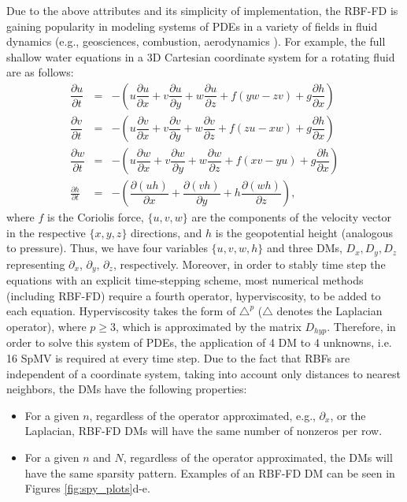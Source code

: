 \documentclass{sig-alternate}
\begin{document}
Due to the above attributes and its simplicity of implementation, the RBF-FD is gaining popularity in modeling systems of PDEs in a variety of fields in fluid dynamics (e.g., geosciences, combustion, aerodynamics \cite{Bayona13,CDNT,FoL11,FLBWSC12,SPLM}). For example, the full shallow water equations in a 3D Cartesian coordinate system for a rotating fluid are as follows:
{ \small
\begin{eqnarray}
\dfrac{\partial u}{\partial t} &=& - \left( u\dfrac{\partial u}{\partial x} + v\dfrac{\partial u}{\partial y} + w\dfrac{\partial u}{\partial z} + f(yw - zv) + g\dfrac{\partial h}{\partial x} \right) 
\nonumber \\
\dfrac{\partial v}{\partial t} &=& - \left( u\dfrac{\partial v}{\partial x} + v\dfrac{\partial v}{\partial y} + w\dfrac{\partial v}{\partial z} + f(zu - xw) + g\dfrac{\partial h}{\partial x} \right)
\nonumber\\
\dfrac{\partial w}{\partial t} &=& - \left( u\dfrac{\partial w}{\partial x} + v\dfrac{\partial w}{\partial y} + w\dfrac{\partial w}{\partial z} + f(xv - yu) + g\dfrac{\partial h}{\partial x} \right)
\nonumber\\
\frac{\partial h}{\partial t}& =&-\left(\dfrac{\partial (uh)}{\partial x} + \dfrac{\partial (vh)}{\partial y} + h\dfrac{\partial (wh)}{\partial z}\right) , \label{height} \nonumber
\end{eqnarray}
}
where $f$ is the Coriolis force, $\{u,v,w\}$ are the components of the velocity vector in the respective $\{x,y,z\}$ directions, and $h$ is the geopotential height (analogous to pressure). Thus, we have four variables $\{u,v,w,h\}$ and three DMs, $D_x, D_y, D_z$ representing  $\partial_x$, $\partial_y$, $\partial_z$, 
respectively. Moreover, in order to stably time step the equations with an explicit time-stepping scheme, most numerical methods (including RBF-FD) require a fourth operator, hyperviscosity, to be added to each equation. Hyperviscosity takes the form of $\triangle^p$ ($\triangle$ denotes the Laplacian operator), where $p\geq3$, which is approximated by the matrix $D_{hyp}$. Therefore, in order to solve this system of PDEs, the application of 4 DM to 4 unknowns, i.e. 16 SpMV is required at every time step. Due to the fact that RBFs are independent of a coordinate system, taking into account only distances to nearest neighbors, the DMs have the following properties:
\begin{itemize}
\item For a given $n$, regardless of the operator approximated, e.g.,
$\partial_x$, 
or the Laplacian, RBF-FD DMs will have the same number of nonzeros per row.
\item For a given $n$ and $N$, regardless of the operator approximated, the DMs will have the same sparsity pattern. Examples of an RBF-FD DM can be seen in Figures \ref{fig:spy_plots}d-e.
\end{itemize}
\end{document}
